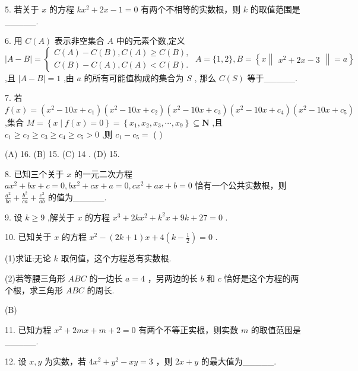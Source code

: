 \documentclass[10pt]{article}
\begin{document}
5. 若关于 \(x\) 的方程 \(k{x}^{2} + {2x} - 1 = 0\) 有两个不相等的实数根，则 \(k\) 的取值范围是\_\_\_\_\_.

6. 用 \(C\left( A\right)\) 表示非空集合 \(A\) 中的元素个数,定义 \(\left| {A - B}\right|  = \left\{  \begin{array}{l} C\left( A\right)  - C\left( B\right) ,C\left( A\right)  \geq  C\left( B\right) , \\  C\left( B\right)  - C\left( A\right) ,C\left( A\right)  < C\left( B\right) . \end{array}\right. \; A = \{ 1,2\} ,B = \left\{  {x\begin{Vmatrix}{{x}^{2} + {2x} - 3}\end{Vmatrix} = a}\right\}\) ,且 \(\left| {A - B}\right|  = 1\) ,由 \(a\) 的所有可能值构成的集合为 \(S\) , 那么 \(C\left( S\right)\) 等于\_\_\_\_\_.

7. 若 \(f\left( x\right)  = \left( {{x}^{2} - {10x} + {c}_{1}}\right) \left( {{x}^{2} - {10x} + {c}_{2}}\right) \left( {{x}^{2} - {10x} + {c}_{3}}\right) \left( {{x}^{2} - {10x} + {c}_{4}}\right) \left( {{x}^{2} - {10x} + {c}_{5}}\right)\) ,集合 \(M = \left\{  {x \mid  f\left( x\right)  = 0}\right\}   = \left\{  {{x}_{1},{x}_{2},{x}_{3},\cdots ,{x}_{9}}\right\}   \subseteq  \mathbf{N}\) ,且 \({c}_{1} \geq  {c}_{2} \geq  {c}_{3} \geq  {c}_{4} \geq  {c}_{5} > 0\) ,则 \({c}_{1} - {c}_{5} =\) ( )

(A) 16. (B) 15. (C) 14 . (D) 15.

8. 已知三个关于 \(x\) 的一元二次方程 \(a{x}^{2} + {bx} + c = 0,b{x}^{2} + {cx} + a = 0,c{x}^{2} + {ax} + b = 0\) 恰有一个公共实数根，则 \(\frac{{a}^{2}}{bc} + \frac{{b}^{2}}{ca} + \frac{{c}^{2}}{ab}\) 的值为\_\_\_\_\_.

9. 设 \(k \geq  9\) ,解关于 \(x\) 的方程 \({x}^{3} + {2k}{x}^{2} + {k}^{2}x + {9k} + {27} = 0\) .

10. 已知关于 \(x\) 的方程 \({x}^{2} - \left( {{2k} + 1}\right) x + 4\left( {k - \frac{1}{2}}\right)  = 0\) .

(1)求证:无论 \(k\) 取何值，这个方程总有实数根.

(2)若等腰三角形 \({ABC}\) 的一边长 \(a = 4\) ，另两边的长 \(b\) 和 \(c\) 恰好是这个方程的两个根，求三角形 \({ABC}\) 的周长.

(B)

11. 已知方程 \({x}^{2} + {2mx} + m + 2 = 0\) 有两个不等正实根，则实数 \(m\) 的取值范围是\_\_\_\_\_.

12. 设 \(x,y\) 为实数，若 \(4{x}^{2} + {y}^{2} - {xy} = 3\) ，则 \({2x} + y\) 的最大值为\_\_\_\_\_.
\end{document}
